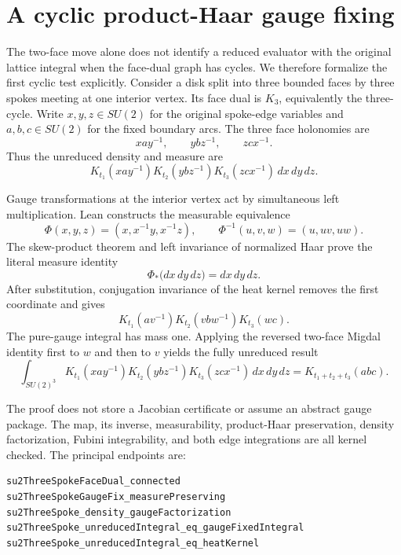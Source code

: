 \documentclass[11pt,a4paper]{article}
\theoremstyle{remark}
\begin{document}
\section{A cyclic product-Haar gauge fixing}

The two-face move alone does not identify a reduced evaluator with the original
lattice integral when the face-dual graph has cycles.  We therefore formalize
the first cyclic test explicitly.  Consider a disk split into three bounded
faces by three spokes meeting at one interior vertex.  Its face dual is
$K_3$, equivalently the three-cycle.  Write $x,y,z\in SU(2)$ for the original
spoke-edge variables and $a,b,c\in SU(2)$ for the fixed boundary arcs.  The
three face holonomies are
\[
  xay^{-1},\qquad ybz^{-1},\qquad zcx^{-1}.
\]
Thus the unreduced density and measure are
\begin{equation}\label{eq:unreduced-three}
  K_{t_1}(xay^{-1})K_{t_2}(ybz^{-1})K_{t_3}(zcx^{-1})
  \,dx\,dy\,dz.
\end{equation}

Gauge transformations at the interior vertex act by simultaneous left
multiplication.  Lean constructs the measurable equivalence
\[
  \Phi(x,y,z)=(x,x^{-1}y,x^{-1}z),
  \qquad
  \Phi^{-1}(u,v,w)=(u,uv,uw).
\]
The skew-product theorem and left invariance of normalized Haar prove the
literal measure identity
\[
  \Phi_*\bigl(dx\,dy\,dz\bigr)=dx\,dy\,dz.
\]
After substitution, conjugation invariance of the heat kernel removes the
first coordinate and gives
\[
  K_{t_1}(av^{-1})K_{t_2}(vbw^{-1})K_{t_3}(wc).
\]
The pure-gauge integral has mass one.  Applying the reversed two-face Migdal
identity first to $w$ and then to $v$ yields the fully unreduced result
\begin{equation}\label{eq:three-spoke-result}
 \int_{SU(2)^3}
  K_{t_1}(xay^{-1})K_{t_2}(ybz^{-1})K_{t_3}(zcx^{-1})
  \,dx\,dy\,dz
  =K_{t_1+t_2+t_3}(abc).
\end{equation}

The proof does not store a Jacobian certificate or assume an abstract gauge
package.  The map, its inverse, measurability, product-Haar preservation,
density factorization, Fubini integrability, and both edge integrations are
all kernel checked.  The principal endpoints are:
\begin{lstlisting}
su2ThreeSpokeFaceDual_connected
su2ThreeSpokeGaugeFix_measurePreserving
su2ThreeSpoke_density_gaugeFactorization
su2ThreeSpoke_unreducedIntegral_eq_gaugeFixedIntegral
su2ThreeSpoke_unreducedIntegral_eq_heatKernel
\end{lstlisting}
\end{document}
